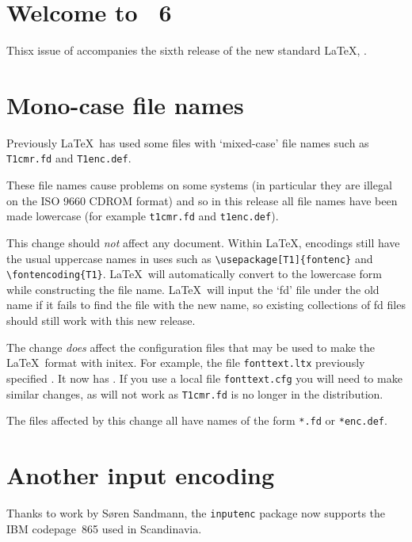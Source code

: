 \documentclass{ltnews}
\providecommand\pkg[1]{\texttt{#1}}
\providecommand\file[1]{\texttt{#1}}
\begin{document}
\maketitle

\section{Welcome to \LaTeXNews~6}
Thisx issue of \emph{\LaTeXNews} accompanies the sixth release of the
new standard \LaTeX{}, \LaTeXe.

\section{Mono-case file names}
Previously \LaTeX\ has used some files with `mixed-case' file names
such as \file{T1cmr.fd} and \file{T1enc.def}.

These file names cause problems on some systems (in particular they
are illegal on the ISO 9660 CDROM format) and so in this release
all file names have been made lowercase (for example
\file{t1cmr.fd} and \file{t1enc.def}).

This change should \emph{not} affect any document. Within \LaTeX,
encodings still have the usual uppercase names in uses such as
\verb|\usepackage[T1]{fontenc}| and \verb|\fontencoding{T1}|.
\LaTeX\ will automatically convert to the lowercase form while
constructing the file name.
\LaTeX\ will input the `fd' file under the old name if it fails to
find the file with the new name, so existing collections of fd files
should still work with this new release.

The change \emph{does} affect the configuration files that may be used
to make the \LaTeX\ format with initex. For example, the file
\file{fonttext.ltx} previously specified \verb||.
It now has \verb||.
If you use a local file \file{fonttext.cfg}
you will need to make similar changes, as \verb||
will not work as \file{T1cmr.fd} is no longer in the distribution.

The files affected by this change all have names of the form
\verb|*.fd| or \verb|*enc.def|.

\section{Another input encoding}
Thanks to work by S\o ren Sandmann, the \pkg{inputenc} package now
supports the IBM codepage~865 used in Scandinavia.
\end{document}
